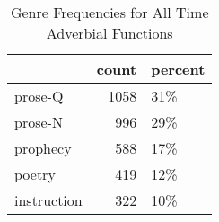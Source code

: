 \begin{table}[htbp!]
\centering
\caption{Genre Frequencies for All Time Adverbial Functions}
\label{table:all_genre_cp}
\begin{tabular}{lrl}
\toprule
{} &  count & percent \\
\midrule
prose-Q     &   1058 &     31\% \\
prose-N     &    996 &     29\% \\
prophecy    &    588 &     17\% \\
poetry      &    419 &     12\% \\
instruction &    322 &     10\% \\
\bottomrule
\end{tabular}
\end{table}
